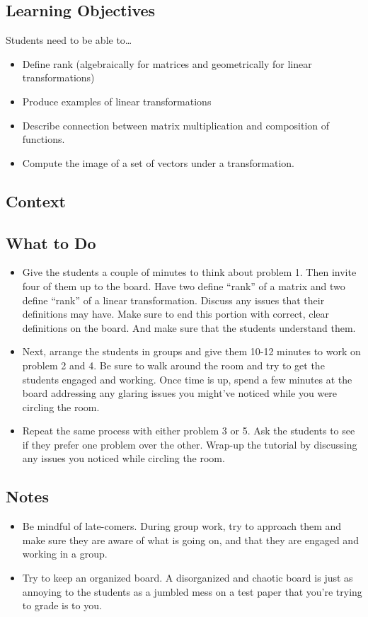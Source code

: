 \subsection*{Learning Objectives}
	Students need to be able to\ldots
	\begin{itemize}
		\item Define rank (algebraically for matrices and geometrically for linear transformations)
		\item Produce examples of linear transformations
		\item Describe connection between matrix multiplication and composition of functions.
		\item Compute the image of a set of vectors under a transformation.
	\end{itemize}

\subsection*{Context}


\subsection*{What to Do}
  	\begin{itemize}
		\item Give the students a couple of minutes to think about
		problem 1. Then invite four of them up to the board. Have
		two define ``rank''
			of a matrix and two define ``rank'' of a linear
			transformation. Discuss any issues that their
			definitions may have. Make sure to end this
			portion with correct, clear definitions on
			the board. And make sure that the students
			understand them.

		\item Next, arrange the students in groups and give them
		10-12 minutes to work on problem 2 and 4. Be sure to
		walk around the room and try to get the students engaged
		and working. Once time is up, spend a few minutes at
		the board addressing any glaring issues you might've
		noticed while you were circling the room.

		\item Repeat the same process with either problem 3 or
		5. Ask the students to see if they prefer one problem
		over the other. Wrap-up the tutorial by discussing any
		issues you noticed while circling the room.
	\end{itemize}

\subsection*{Notes}
  	\begin{itemize}
		\item Be mindful of late-comers. During group work, try to approach them and make sure they are aware of what is going on, and that they are engaged and working in a group.
		\item Try to keep an organized board. A disorganized and chaotic board is just as annoying to the students as a jumbled mess on a test paper that you're trying to grade is to you.
	\end{itemize}